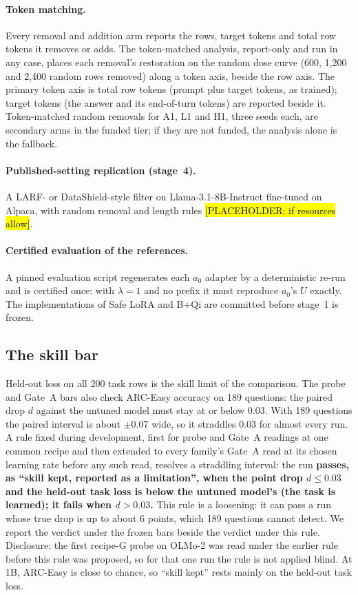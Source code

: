 \documentclass{article}
\theoremstyle{plain}
\theoremstyle{definition}
\theoremstyle{remark}
\newcommand{\ph}[1]{\hl{#1}}
\begin{document}
\paragraph{Token matching.}
Every removal and addition arm reports the rows, target tokens and total row
tokens it removes or adds. The token-matched analysis, report-only and run in
any case, places each removal's restoration on the random dose curve (600,
1,200 and 2,400 random rows removed) along a token axis, beside the row axis.
The primary token axis is total row tokens (prompt plus target tokens, as
trained); target tokens (the answer and its end-of-turn tokens) are reported
beside it. Token-matched random
removals for A1, L1 and H1, three seeds each, are secondary arms in the funded
tier; if they are not funded, the analysis alone is the fallback.

\paragraph{Published-setting replication (stage~4).}
A LARF- or DataShield-style filter on Llama-3.1-8B-Instruct fine-tuned on
Alpaca, with random removal and length rules
\ph{[PLACEHOLDER: if resources allow]}.

\paragraph{Certified evaluation of the references.}
A pinned evaluation script regenerates each $a_0$ adapter by a deterministic
re-run and is certified once: with $\lambda = 1$ and no prefix it must
reproduce $a_0$'s $U$ exactly. The implementations of Safe LoRA and B+Qi are committed
before stage~1 is frozen.

\subsection{The skill bar}
\label{app:skill}

Held-out loss on all 200 task rows is the skill limit of the comparison. The
probe and Gate~A bars also check ARC-Easy accuracy \citep{clark2018arc} on 189
questions: the paired drop $d$ against the untuned model must stay at or below
0.03. With 189 questions the paired interval is about $\pm 0.07$ wide, so it
straddles 0.03 for almost every run. A rule fixed during development, first
for probe and Gate~A readings at one common recipe and then extended to every
family's Gate~A read at its chosen learning rate before any such read,
resolves a straddling interval: the run \textbf{passes, as ``skill kept,
reported as a limitation'', when the point drop $d \le 0.03$ and the held-out
task loss is below the untuned model's (the task is learned); it fails when
$d > 0.03$.} This rule is a loosening: it can pass a run whose true drop is up
to about 6 points, which 189 questions cannot detect. We report the verdict
under the frozen bars beside the verdict under this rule. Disclosure: the
first recipe-G probe on OLMo-2 was read under the earlier rule before this rule
was proposed, so for that one run the rule is not applied blind. At 1B,
ARC-Easy is close to chance, so ``skill kept'' rests mainly on the held-out
task loss.
\end{document}
